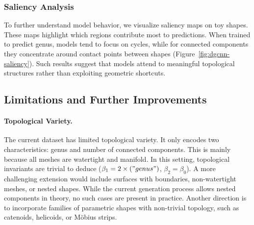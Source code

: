 


\subsubsection{Saliency Analysis}
\label{sssec:topogen-saliency}

To further understand model behavior, we visualize saliency maps on toy shapes. These maps highlight which regions contribute most to predictions. When trained to predict genus, models tend to focus on cycles, while for connected components they concentrate around contact points between shapes (Figure~\ref{fig:dgcnn-saliency}). Such results suggest that models attend to meaningful topological structures rather than exploiting geometric shortcuts.






\subsection{Limitations and Further Improvements}

\paragraph{Topological Variety.} 
The current dataset has limited topological variety. It only encodes two characteristics: genus and number of connected components. This is mainly because all meshes are watertight and manifold. In this setting, topological invariants are trivial to deduce ($\beta_1= 2 \times \text("genus")$, $\beta_2=\beta_0$). A more challenging extension would include surfaces with boundaries, non-watertight meshes, or nested shapes. While the current generation process allows nested components in theory, no such cases are present in practice. Another direction is to incorporate families of parametric shapes with non-trivial topology, such as catenoids, helicoids, or Möbius strips.


